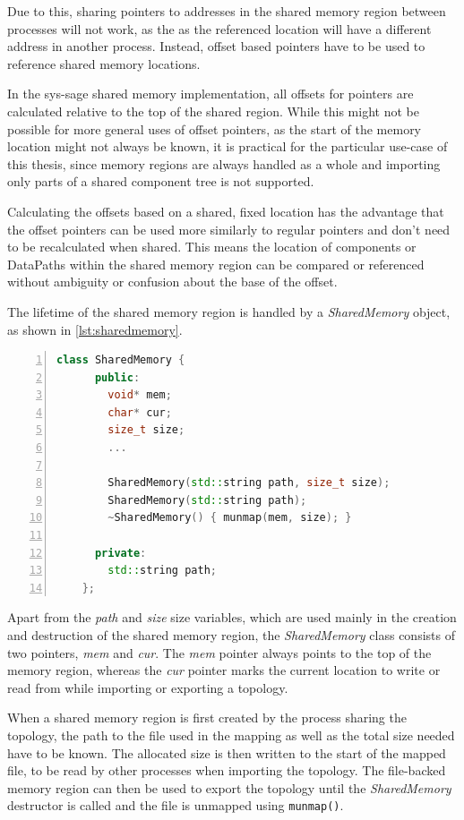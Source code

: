 Due to this, sharing pointers to addresses in the shared memory region between processes will not work, as the as the referenced location will have a different address in another process.
Instead, offset based pointers have to be used to reference shared memory locations.

In the sys-sage shared memory implementation, all offsets for pointers are calculated relative to the top of the shared region.
While this might not be possible for more general uses of offset pointers, as the start of the memory location might not always be known,
it is practical for the particular use-case of this thesis, since  memory regions are always handled as a whole and importing only parts of a shared component tree is not supported.

Calculating the offsets based on a shared, fixed location has the advantage that the offset pointers can be used more similarly to regular pointers and don't need to be recalculated when shared.
This means the location of components or DataPaths within the shared memory region can be compared or referenced without ambiguity or confusion about the base of the offset.

The lifetime of the shared memory region is handled by a \emph{SharedMemory} object, as shown in \autoref{lst:sharedmemory}.

\begin{lstlisting}[language=c++, numbers=left, caption=SharedMemory Class, captionpos=b, label={lst:sharedmemory}]
    class SharedMemory {
      public:
        void* mem;
        char* cur;
        size_t size;
        ...

        SharedMemory(std::string path, size_t size);
        SharedMemory(std::string path);
        ~SharedMemory() { munmap(mem, size); }

      private:
        std::string path;
    };
\end{lstlisting}

Apart from the \emph{path} and \emph{size} size variables, which are used mainly in the creation and destruction of the shared memory region,
the \emph{SharedMemory} class consists of two pointers, \emph{mem} and \emph{cur}.
The \emph{mem} pointer always points to the top of the memory region, whereas the \emph{cur} pointer marks the current location to write or read from while importing or exporting a topology.

When a shared memory region is first created by the process sharing the topology, the path to the file used in the mapping as well as the total size needed have to be known.
The allocated size is then written to the start of the mapped file, to be read by other processes when importing the topology.
The file-backed memory region can then be used to export the topology until the \emph{SharedMemory} destructor is called and the file is unmapped using \lstinline{munmap()}.

